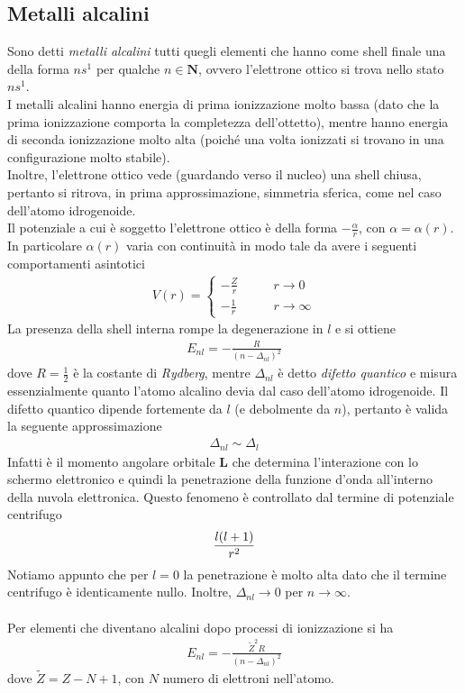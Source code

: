 \documentclass{article}
\begin{document}
\subsection{Metalli alcalini}
Sono detti \textit{metalli alcalini} tutti quegli elementi che hanno come shell finale una della forma $ns^1$ per qualche $n \in \mathbf{N}$, ovvero l'elettrone ottico si trova nello stato $ns^1$. \\
I metalli alcalini hanno energia di prima ionizzazione molto bassa (dato che la prima ionizzazione comporta la completezza dell'ottetto), mentre hanno energia di seconda ionizzazione molto alta (poiché una volta ionizzati si trovano in una configurazione molto stabile). \\
Inoltre, l'elettrone ottico vede (guardando verso il nucleo) una shell chiusa, pertanto si ritrova, in prima approssimazione, simmetria sferica, come nel caso dell'atomo idrogenoide. \\
Il potenziale a cui è soggetto l'elettrone ottico è della forma $-\frac{\alpha}{r}$, con $\alpha = \alpha(r)$. In particolare $\alpha(r)$ varia con continuità in modo tale da avere i seguenti comportamenti asintotici
\begin{align}
    V(r) = \begin{cases}
        -\frac{Z}{r} \qquad &r \rightarrow 0 \\
        -\frac{1}{r} \qquad &r \rightarrow \infty
    \end{cases} \tag{2.1.1}
\end{align}
La presenza della shell interna rompe la degenerazione in $l$ e si ottiene 
\begin{align}
    E_{nl} = -\frac{R}{(n - \Delta_{nl})^2} \tag{2.1.2}
\end{align}
dove $R = \frac{1}{2}$ è la costante di \textit{Rydberg}, mentre $\Delta_{nl}$ è detto \textit{difetto quantico} e misura essenzialmente quanto l'atomo alcalino devia dal caso dell'atomo idrogenoide. Il difetto quantico dipende fortemente da $l$ (e debolmente da $n$), pertanto è valida la seguente approssimazione 
\begin{align}
    \Delta_{nl} \sim \Delta_l \tag{2.1.3}
\end{align}
Infatti è il momento angolare orbitale $\mathbf{L}$ che determina l'interazione con lo schermo elettronico e quindi la penetrazione della funzione d'onda all'interno della nuvola elettronica. Questo fenomeno è controllato dal termine di potenziale centrifugo 
\begin{align}
    \frac{l(l + 1)}{r^2} \notag
\end{align}
Notiamo appunto che per $l = 0$ la penetrazione è molto alta dato che il termine centrifugo è identicamente nullo. Inoltre, $\Delta_{nl} \rightarrow 0$ per $n \rightarrow \infty$. \\ \\
Per elementi che diventano alcalini dopo processi di ionizzazione si ha 
\begin{align}
    E_{nl} = -\frac{\tilde{Z}^2R}{(n - \Delta_{nl})^2} \tag{2.1.4}
\end{align}
dove $\tilde{Z} = Z - N + 1$, con $N$ numero di elettroni nell'atomo.
\end{document}
